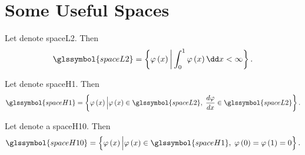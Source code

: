 \section{Some Useful Spaces}
%
\begin{definition}	\label{def:SpaceL2}
	Let  denote \gls{spaceL2}. Then
	\begin{equation}
		\glssymbol{spaceL2} = \left\{ \varphi \left( x \right) \bigg \vert \int_0^1 \varphi \left( x \right) \dd x < \infty \right\}.
	\end{equation}
\end{definition}
%
\begin{definition}	\label{def:Space_H1}
	Let  denote \gls{spaceH1}. Then
	\begin{equation}
		\glssymbol{spaceH1} = \left\{ \varphi \left( x \right) \Big \vert \varphi \left( x \right) \in \glssymbol{spaceL2}, \;
			\frac{d \varphi }{dx} \in \glssymbol{spaceL2} \right\}.
	\end{equation}
\end{definition}
%
\begin{definition}	\label{def:Space_H10}
	Let  denote a \gls{spaceH10}. Then
	\begin{equation}
		\glssymbol{spaceH10} = \left\{ \varphi \left( x \right) \Big \vert \varphi \left( x \right) \in \glssymbol{spaceH1}, \;
			\varphi \left( 0 \right) = \varphi \left( 1 \right) = 0 \right\}.
	\end{equation}
\end{definition}
%
